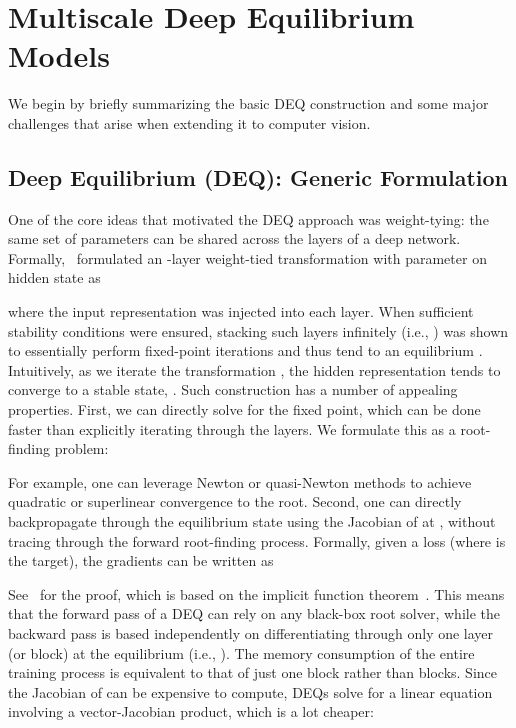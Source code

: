 \documentclass{article}
\begin{document}
\section{Multiscale Deep Equilibrium Models}

We begin by briefly summarizing the basic DEQ construction and some major challenges that arise when extending it to computer vision.

\subsection{Deep Equilibrium (DEQ): Generic Formulation}
\label{subsec:deq-intro}

One of the core ideas that motivated the DEQ approach was weight-tying: the same set of parameters can be shared across the layers of a deep network. Formally,~\citet{bai2019deep} formulated an -layer weight-tied transformation with parameter  on hidden state  as

where the input representation  was injected into each layer. When sufficient stability conditions were ensured, stacking such layers infinitely (i.e., ) was shown to essentially perform fixed-point iterations and thus tend to an equilibrium . Intuitively, as we iterate the transformation , the hidden representation tends to converge to a stable state, . Such construction has a number of appealing properties. First, we can directly solve for the fixed point, which can be done faster than explicitly iterating through the layers. We formulate this as a root-finding problem:

For example, one can leverage Newton or quasi-Newton methods to achieve quadratic or superlinear convergence to the root. Second, one can directly backpropagate through the equilibrium state using the Jacobian of  at , without tracing through the forward root-finding process. Formally, given a loss  (where  is the target), the gradients can be written as

See~\citet{bai2019deep} for the proof, which is based on the implicit function theorem~\cite{krantz2012implicit}. This means that the forward pass of a DEQ can rely on any black-box root solver, while the backward pass is based independently on differentiating through only one layer (or block) at the equilibrium (i.e., ). The memory consumption of the entire training process is equivalent to that of just one block rather than  blocks. Since the Jacobian of  can be expensive to compute, DEQs solve for a linear equation involving a vector-Jacobian product, which is a lot cheaper:
\end{document}
